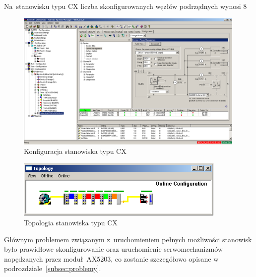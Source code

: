 Na~stanowisku typu CX liczba skonfigurowanych węzłów podrzędnych wynosi 8
\begin{figure}[!htb] 	\centering 	\includegraphics[width=0.99\textwidth]{images/confCX} \caption{Konfiguracja stanowiska typu CX} \label{conf:cx} \end{figure}
\begin{figure}[!htb] 	\centering 	\includegraphics[width=0.9\textwidth]{images/topologyCX} \caption{Topologia stanowiska typu CX} \label{topology:cx} \end{figure}

Głównym problemem związanym z~uruchomieniem pełnych możliwości stanowisk było prawidłowe skonfigurowanie oraz uruchomienie serwomechanizmów napędzanych przez moduł~AX5203, co zostanie szczegółowo opisane w podrozdziale~\ref{subsec:problemy}.
%
%

%
%
%
